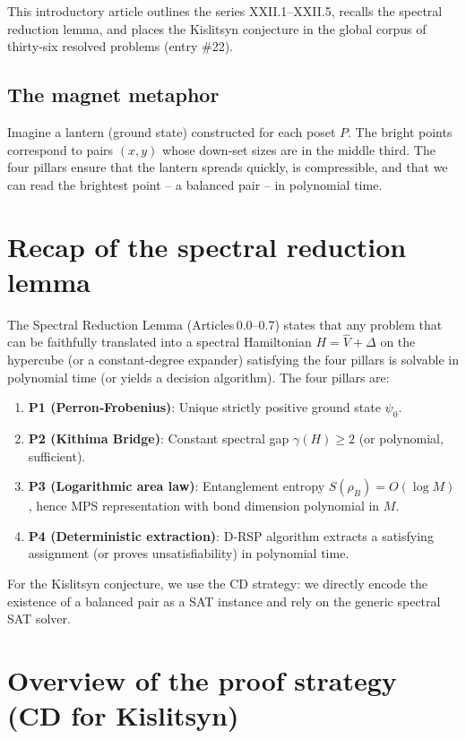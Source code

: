 \documentclass[11pt,a4paper]{article}
\begin{document}
This introductory article outlines the series XXII.1–XXII.5, recalls the spectral reduction lemma, and places the Kislitsyn conjecture in the global corpus of thirty‑six resolved problems (entry \#22).

\subsection{The magnet metaphor}

Imagine a lantern (ground state) constructed for each poset $P$. The bright points correspond to pairs $(x,y)$ whose down‑set sizes are in the middle third. The four pillars ensure that the lantern spreads quickly, is compressible, and that we can read the brightest point – a balanced pair – in polynomial time.

\section{Recap of the spectral reduction lemma}

The Spectral Reduction Lemma (Articles 0.0–0.7) states that any problem that can be faithfully translated into a spectral Hamiltonian $H = \hat{V} + \Delta$ on the hypercube (or a constant‑degree expander) satisfying the four pillars is solvable in polynomial time (or yields a decision algorithm). The four pillars are:

\begin{enumerate}
\item \textbf{P1 (Perron‑Frobenius)}: Unique strictly positive ground state $\psi_0$.
\item \textbf{P2 (Kithima Bridge)}: Constant spectral gap $\gamma(H) \ge 2$ (or polynomial, sufficient).
\item \textbf{P3 (Logarithmic area law)}: Entanglement entropy $S(\rho_B)=O(\log M)$, hence MPS representation with bond dimension polynomial in $M$.
\item \textbf{P4 (Deterministic extraction)}: D‑RSP algorithm extracts a satisfying assignment (or proves unsatisfiability) in polynomial time.
\end{enumerate}

For the Kislitsyn conjecture, we use the CD strategy: we directly encode the existence of a balanced pair as a SAT instance and rely on the generic spectral SAT solver.

\section{Overview of the proof strategy (CD for Kislitsyn)}
\end{document}
